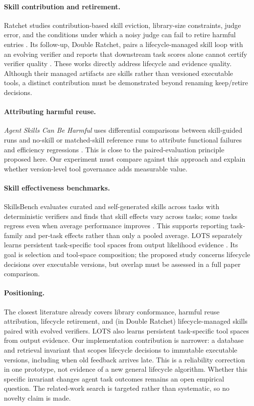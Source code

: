 \documentclass[11pt]{article}
\begin{document}
\paragraph{Skill contribution and retirement.}
Ratchet studies contribution-based skill eviction, library-size constraints, judge error, and the conditions under which a noisy judge can fail to retire harmful entries \cite{ratchet}. Its follow-up, Double Ratchet, pairs a lifecycle-managed skill loop with an evolving verifier and reports that downstream task scores alone cannot certify verifier quality \cite{doubleratchet}. These works directly address lifecycle and evidence quality. Although their managed artifacts are skills rather than versioned executable tools, a distinct contribution must be demonstrated beyond renaming keep/retire decisions.

\paragraph{Attributing harmful reuse.}
\emph{Agent Skills Can Be Harmful} uses differential comparisons between skill-guided runs and no-skill or matched-skill reference runs to attribute functional failures and efficiency regressions \cite{skillharm}. This is close to the paired-evaluation principle proposed here. Our experiment must compare against this approach and explain whether version-level tool governance adds measurable value.

\paragraph{Skill effectiveness benchmarks.}
SkillsBench evaluates curated and self-generated skills across tasks with deterministic verifiers and finds that skill effects vary across tasks; some tasks regress even when average performance improves \cite{skillsbench}. This supports reporting task-family and per-task effects rather than only a pooled average. LOTS separately learns persistent task-specific tool spaces from output likelihood evidence \cite{lots}. Its goal is selection and tool-space composition; the proposed study concerns lifecycle decisions over executable versions, but overlap must be assessed in a full paper comparison.

\paragraph{Positioning.}
The closest literature already covers library conformance, harmful reuse attribution, lifecycle retirement, and (in Double Ratchet) lifecycle-managed skills paired with evolved verifiers. LOTS also learns persistent task-specific tool spaces from output evidence. Our implementation contribution is narrower: a database and retrieval invariant that scopes lifecycle decisions to immutable executable versions, including when old feedback arrives late. This is a reliability correction in one prototype, not evidence of a new general lifecycle algorithm. Whether this specific invariant changes agent task outcomes remains an open empirical question. The related-work search is targeted rather than systematic, so no novelty claim is made.
\end{document}
